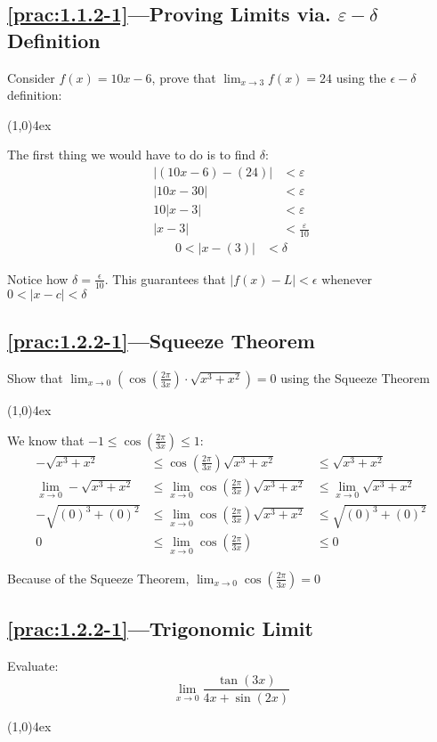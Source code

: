 \documentclass{MathNotes}
\newcommand{\br}{
\begin{center}
\line(1,0){4ex}
\end{center}}
\begin{document}
\subsection*{\ref{prac:1.1.2-1}---Proving Limits via. $\varepsilon-\delta$ Definition}
\label{ans:1.1.2-1}
Consider $f(x)=10x-6$, prove that $\displaystyle\lim_{x\to 3}f(x)=24$ using the 
$\epsilon-\delta$ definition:
\br
The first thing we would have to do is to find $\delta$:
\begin{align*}
    \lvert (10x-6)-(24) \rvert &<\varepsilon  \\
    \lvert 10x-30 \rvert &<\varepsilon \\
    10\lvert x-3 \rvert &<\varepsilon \\
    \lvert x-3 \rvert &<\frac{\varepsilon}{10}
\end{align*}
\begin{align*}
    0 < \lvert x - (3)\rvert &< \delta
\end{align*}

Notice how $\delta=\frac{\epsilon}{10}$. This guarantees that
$\lvert f(x)-L \rvert < \epsilon$ whenever $0<\lvert x-c \rvert<\delta$

\subsection*{\ref{prac:1.2.2-1}---Squeeze Theorem}\label{ans:1.2.2-1}
Show that
$\displaystyle\lim_{x\to 0}(\cos(\frac{2\pi}{3x})\cdot\sqrt{x^3+x^2})=0$
using the Squeeze Theorem
\br
We know that $\displaystyle-1\leq\cos(\frac{2\pi}{3x})\leq 1$:
\begin{align*}
    -\sqrt{x^3+x^2}&\leq\cos(\frac{2\pi}{3x})\sqrt{x^3+x^2}&\leq
    \sqrt{x^3+x^2}
    \\
    \lim_{x\to 0}-\sqrt{x^3+x^2}&\leq\lim_{x\to 0}\cos(\frac{2\pi}{3x})
    \sqrt{x^3+x^2}&\leq\lim_{x\to 0}\sqrt{x^3+x^2}
    \\
    -\sqrt{(0)^3+(0)^2}&\leq\lim_{x\to 0}\cos(\frac{2\pi}{3x})
    \sqrt{x^3+x^2}&\leq\sqrt{(0)^3+(0)^2}
    \\
    0&\leq\lim_{x\to 0}\cos(\frac{2\pi}{3x})&\leq0 
\end{align*}

Because of the Squeeze Theorem, $\displaystyle\lim_{x\to 0}\cos(\frac{2\pi}{3x})=0$

\subsection*{\ref{prac:1.2.2-1}---Trigonomic Limit}\label{ans:1.2.2-2}
Evaluate:
$$\lim_{x\to 0}\frac{\tan(3x)}{4x+\sin(2x)}$$
\br
\end{document}
